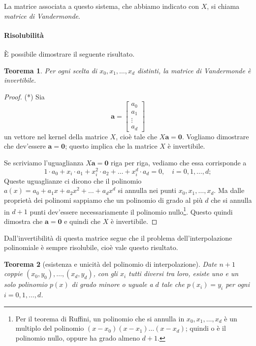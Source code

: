 \documentclass[a4paper]{report}
\newtheorem{theorem}{Teorema}[chapter]
\theoremstyle{definiton}
\theoremstyle{remark}
\begin{document}
La matrice associata a questo sistema, che abbiamo indicato con $X$, si chiama \emph{matrice di Vandermonde}.

\paragraph{Risolubilità} È possibile dimostrare il seguente risultato.
\begin{theorem}
Per ogni scelta di $x_0,x_1,\dots, x_d$ \emph{distinti}, la matrice di Vandermonde è invertibile.
\end{theorem}
\begin{proof} (*)
Sia
\[
\mathbf{a} = \begin{bmatrix}
    a_0\\
    a_1\\
    \vdots\\
    a_d
\end{bmatrix}
\]
un vettore nel kernel della matrice $X$, cioè tale che $X\mathbf{a} = \mathbf{0}$. Vogliamo dimostrare che dev'essere $\mathbf{a} = \mathbf{0}$; questo implica che la matrice $X$ è invertibile.

Se scriviamo l'uguaglianza $X\mathbf{a} = \mathbf{0}$ riga per riga, vediamo che essa corrisponde a
\[
1\cdot a_0 + x_i \cdot a_1 + x_i^2 \cdot a_2 + \dots + x_i^d \cdot a_d = 0, \quad i=0,1,\dots,d;
\]
Queste uguaglianze ci dicono che il polinomio $a(x) = a_0 + a_1 x + a_2 x^2 + \dots + a_d x^d$ si annulla nei punti $x_0, x_1, \dots, x_d$. Ma dalle proprietà dei polinomi sappiamo che un polinomio di grado al più $d$ che si annulla in $d+1$ punti dev'essere necessariamente il polinomio nullo\footnote{Per il teorema di Ruffini, un polinomio che si annulla in $x_0,x_1,\dots,x_d$ è un multiplo del polinomio $(x-x_0)(x-x_1)\dots (x-x_d)$; quindi o è il polinomio nullo, oppure ha grado almeno $d+1$.}. Questo quindi dimostra che $\mathbf{a}=\mathbf{0}$ e quindi che $X$ è invertibile.
\end{proof}
Dall'invertibilità di questa matrice segue che il problema dell'interpolazione polinomiale è sempre risolubile, cioè vale questo risultato.
\begin{theorem}[esistenza e unicità del polinomio di interpolazione]
Date $n+1$ coppie $(x_0,y_0),\dots,(x_d,y_d)$, con gli $x_i$ tutti diversi tra loro, esiste uno e un solo polinomio $p(x)$ di grado minore o uguale a $d$ tale che $p(x_i)=y_i$ per ogni $i=0,1,\dots,d$.
\end{theorem}
\end{document}
